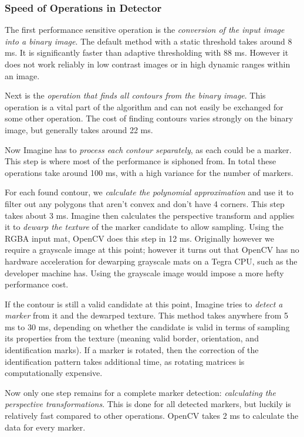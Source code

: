 \subsubsection{Speed of Operations in Detector}

The first performance sensitive operation is the \textit{conversion of the input image into a binary image}.
The default method with a static threshold takes around 8 ms.
It is significantly faster than adaptive thresholding with 88 ms.
However it does not work reliably in low contrast images or in high dynamic ranges within an image.

Next is the \textit{operation that finds all contours from the binary image}.
This operation is a vital part of the algorithm and can not easily be exchanged for some other operation.
The cost of finding contours varies strongly on the binary image, but generally takes around 22 ms.

Now Imagine has to \textit{process each contour separately}, as each could be a marker.
This step is where most of the performance is siphoned from.
In total these operations take around 100 ms, with a high variance for the number of markers.

For each found contour, we \textit{calculate the polynomial approximation} and use it to filter out any polygons that aren't convex and don't have 4 corners.
This step takes about 3 ms.
Imagine then calculates the perspective transform and applies it to \textit{dewarp the texture} of the marker candidate to allow sampling.
Using the RGBA input mat, OpenCV does this step in 12 ms.
Originally however we require a grayscale image at this point; however it turns out that OpenCV has no hardware acceleration for dewarping grayscale mats on a Tegra CPU, such as the developer machine has.
Using the grayscale image would impose a more hefty performance cost.

If the contour is still a valid candidate at this point, Imagine tries to \textit{detect a marker} from it and the dewarped texture.
This method takes anywhere from 5 ms to 30 ms, depending on whether the candidate is valid in terms of sampling its properties from the texture (meaning valid border, orientation, and identification marks).
If a marker is rotated, then the correction of the identification pattern takes additional time, as rotating matrices is computationally expensive.

Now only one step remains for a complete marker detection: \textit{calculating the perspective transformations}.
This is done for all detected markers, but luckily is relatively fast compared to other operations.
OpenCV takes 2 ms to calculate the data for every marker.

